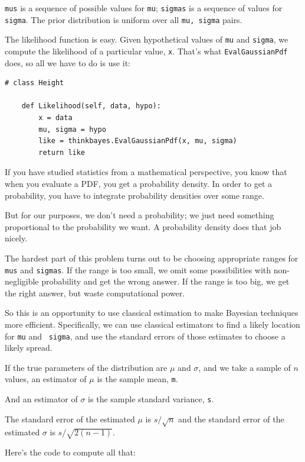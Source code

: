 \documentclass[12pt]{book}
\begin{document}
{\tt mus} is a sequence of possible values for {\tt mu}; {\tt sigmas}
is a sequence of values for {\tt sigma}.  The prior distribution
is uniform over all {\tt mu, sigma} pairs.

The likelihood function is easy.  Given hypothetical values
of {\tt mu} and {\tt sigma}, we compute the likelihood
of a particular value, {\tt x}.  That's what {\tt EvalGaussianPdf}
does, so all we have to do is use it:

\begin{verbatim}
# class Height

    def Likelihood(self, data, hypo):
        x = data
        mu, sigma = hypo
        like = thinkbayes.EvalGaussianPdf(x, mu, sigma)
        return like
\end{verbatim}

If you have studied statistics from a mathematical perspective,
you know that when you evaluate a PDF, you get a probability
density.  In order to get a probability, you have to integrate
probability densities over some range.

But for our purposes, we don't need a probability; we just
need something proportional to the probability we want.
A probability density does that job nicely.

The hardest part of this problem turns
out to be choosing appropriate ranges for {\tt mus} and
{\tt sigmas}.  If the range is too small, we omit some
possibilities with non-negligible probability and get the
wrong answer.  If the range is too big, we get the right answer,
but waste computational power.

So this is an opportunity to use classical estimation to
make Bayesian techniques more efficient.  Specifically, we can use
classical estimators to find a likely location for {\tt mu} and {\tt
  sigma}, and use the standard errors of those estimates to choose a
likely spread.

If the true parameters of the distribution are $\mu$ and $\sigma$, and
we take a sample of $n$ values, an estimator of $\mu$ is the sample
mean, {\tt m}.

And an estimator of $\sigma$ is the sample standard
variance, {\tt s}.

The standard error of the estimated $\mu$ is $s / \sqrt{n}$
and the standard error of the estimated $\sigma$ is
$s / \sqrt{2 (n-1)}$.

Here's the code to compute all that:
\end{document}
